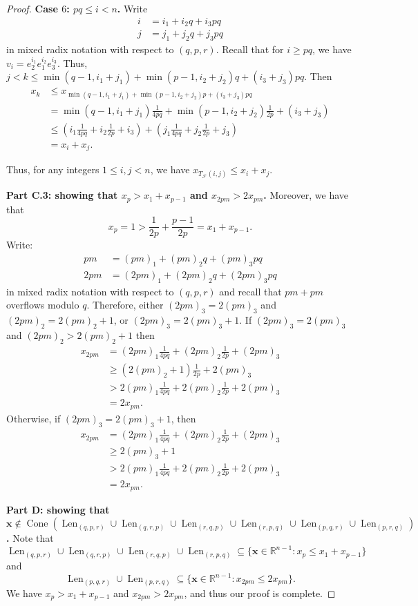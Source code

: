 \documentclass[letterpaper,10pt]{amsart}
\DeclareMathOperator{\Len}{Len}
\DeclareMathOperator{\Cone}{Cone}
\newcommand{\RR}{\mathbb{R}}      %
\newcommand{\cF}{\mathcal{F}}
\theoremstyle{definition}
\theoremstyle{remark}
\begin{document}
\begin{proof}
\noindent \textbf{Case $6$: $pq \leq i < n$.}
Write 
\begin{align*}
i &= i_1 + i_2q + i_3pq \\
j &= j_1 + j_2q + j_3pq
\end{align*}
in mixed radix notation with respect to $(q,p,r)$. Recall that for $i \geq pq$, we have $v_i = e_2^{i_1}e_1^{i_2}e_3^{i_3}$. Thus, $j < k \leq \min(q-1,i_1+j_1) + \min(p-1,i_2+j_2)q + (i_3 + j_3)pq$.  Then
\begin{align*}
x_k &\leq x_{\min(q-1,i_1+j_1) + \min(p-1,i_2+j_2)p + (i_3 + j_3)pq} \\
& = \min(q-1,i_1+j_1) \frac{1}{4pq} + \min(p-1,i_2+j_2)\frac{1}{2p} + (i_3 + j_3) \\
&\leq (i_1 \frac{1}{4pq} + i_2 \frac{1}{2p} + i_3) + (j_1 \frac{1}{4pq} + j_2 \frac{1}{2p} + j_3) \\
&=x_i + x_j.
\end{align*}

Thus, for any integers $1 \leq i,j < n$, we have $x_{T_{\cF}(i,j)} \leq x_i + x_j$. 

\noindent \textbf{Part C.3: showing that $x_p > x_1 + x_{p-1}$ and $x_{2pm} > 2x_{pm}$.}
Moreover, we have that
\[
	x_p = 1 > \frac{1}{2p} + \frac{p-1}{2p} = x_1 + x_{p-1}.
\]
Write: 
\begin{align*}
pm &= (pm)_1 + (pm)_2q + (pm)_3pq \\
2pm &= (2pm)_1 + (2pm)_2q + (2pm)_3pq
\end{align*}
in mixed radix notation with respect to $(q,p,r)$ and recall that $pm + pm$ overflows modulo $q$. Therefore, either $(2pm)_3 = 2(pm)_3$ and $(2pm)_2 = 2(pm)_2 + 1$, or $(2pm)_3 = 2(pm)_3 + 1$. If $(2pm)_3 = 2(pm)_3$ and $(2pm)_2 > 2(pm)_2+1$ then
\begin{align*}
x_{2pm} &= (2pm)_1 \frac{1}{4pq} + (2pm)_2\frac{1}{2p} + (2pm)_3 \\
&\geq (2(pm)_2+1)\frac{1}{2p} + 2(pm)_3 \\
&> 2(pm)_1\frac{1}{4pq} + 2(pm)_2\frac{1}{2p} + 2(pm)_3 \\
&= 2x_{pm}.
\end{align*}
Otherwise, if $(2pm)_3 = 2(pm)_3 + 1$, then 
\begin{align*}
x_{2pm} &= (2pm)_1 \frac{1}{4pq} + (2pm)_2\frac{1}{2p} + (2pm)_3 \\
&\geq 2(pm)_3 + 1 \\
&> 2(pm)_1\frac{1}{4pq} + 2(pm)_2\frac{1}{2p} + 2(pm)_3 \\
&= 2x_{pm}.
\end{align*}

\noindent \textbf{Part D: showing that $\mathbf{x} \notin \Cone(\Len_{(q,p,r)} \cup \Len_{(q,r,p)} \cup \Len_{(r,q,p)} \cup \Len_{(r,p,q)} \cup \Len_{(p,q,r)} \cup \Len_{(p,r,q)})$.}
Note that 
\[
	\Len_{(q,p,r)} \cup \Len_{(q,r,p)} \cup \Len_{(r,q,p)} \cup \Len_{(r,p,q)} \subseteq \{\mathbf{x} \in \RR^{n-1} : x_{p} \leq x_1 + x_{p-1} \}
\]
and
\[
	\Len_{(p,q,r)} \cup \Len_{(p,r,q)} \subseteq \{\mathbf{x} \in \RR^{n-1} : x_{2pm} \leq 2x_{pm}\}.
\]
We have $x_p > x_1 + x_{p-1}$ and $x_{2pm} > 2x_{pm}$, and thus our proof is complete. 
\end{proof}
\end{document}
